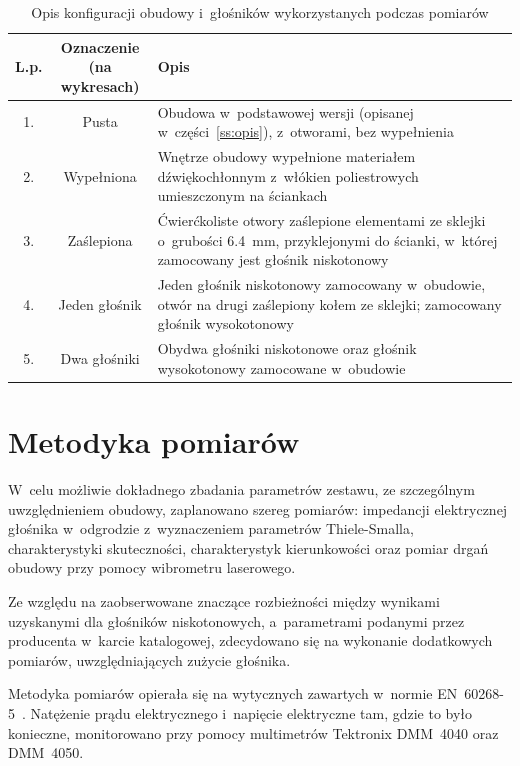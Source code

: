 \documentclass[12pt]{oska}
\begin{document}
		\begin{table}[H]
			\centering
			\caption{Opis konfiguracji obudowy i~głośników wykorzystanych podczas pomiarów}
			\label{t:obudowa}
			\begin{tabular}{|c|c|m{}|}
				\hline
				\textbf{L.p.} & \makecell{\textbf{Oznaczenie}\\\textbf{(na wykresach)}} & \centering\textbf{Opis} \tabularnewline\hline
				1. & Pusta & Obudowa w~podstawowej wersji (opisanej w~części~\ref{ss:opis}), z~otworami, bez wypełnienia \\\hline
				2. & Wypełniona & Wnętrze obudowy wypełnione materiałem dźwiękochłonnym z~włókien poliestrowych umieszczonym na ściankach \\\hline
				3. & Zaślepiona & Ćwierćkoliste otwory zaślepione elementami ze sklejki o~grubości \SI{6,4}{\milli\metre}, przyklejonymi do ścianki, w~której zamocowany jest głośnik niskotonowy\\\hline
				\hline
				4. & Jeden głośnik & Jeden głośnik niskotonowy zamocowany w~obudowie, otwór na drugi zaślepiony kołem ze sklejki; zamocowany głośnik wysokotonowy \\\hline
				5. & Dwa głośniki & Obydwa głośniki niskotonowe oraz głośnik wysokotonowy zamocowane w~obudowie\\\hline
			\end{tabular}
		\end{table}

\section{Metodyka pomiarów}

	W~celu możliwie dokładnego zbadania parametrów zestawu, ze szczególnym uwzględnieniem obudowy, zaplanowano szereg pomiarów: impedancji elektrycznej głośnika w~odgrodzie z~wyznaczeniem parametrów Thiele-Smalla, charakterystyki skuteczności, charakterystyk kierunkowości oraz pomiar drgań obudowy przy pomocy wibrometru laserowego.
	
	Ze względu na zaobserwowane znaczące rozbieżności między wynikami uzyskanymi dla głośników niskotonowych, a~parametrami podanymi przez producenta w~karcie katalogowej, zdecydowano się na wykonanie dodatkowych pomiarów, uwzględniających zużycie głośnika.
	
	Metodyka pomiarów opierała się na wytycznych zawartych w~normie EN~60268-5~\cite{norma}. Natężenie prądu elektrycznego i~napięcie elektryczne tam, gdzie to było konieczne, monitorowano przy pomocy multimetrów Tektronix DMM~4040 oraz DMM~4050.
	
\end{document}
